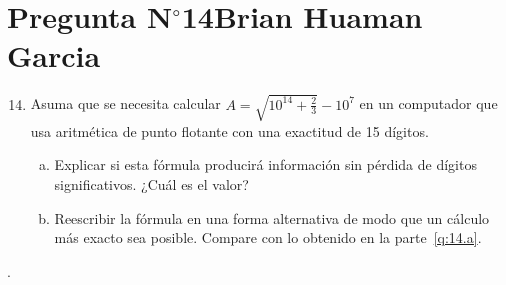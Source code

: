 \section{Pregunta N$^{\circ}$14\qquad Brian Huaman Garcia}

\begin{frame}
	\begin{enumerate}\setcounter{enumi}{13}
		\item

		      Asuma que se necesita calcular
		      \begin{math}
			      A=
			      \sqrt{10^{14}+\frac{2}{3}}-10^{7}
		      \end{math}
		      en un computador que usa aritmética de punto flotante con
		      una exactitud de 15 dígitos.

		      \begin{enumerate}[a)]
			      \item\label{q:14.a}

			      Explicar si esta fórmula producirá información sin
			      pérdida de dígitos significativos.
			      ¿Cuál es el valor?

			      \item\label{q:14.b}

			      Reescribir la fórmula en una forma alternativa de
			      modo que un cálculo más exacto sea posible.
			      Compare con lo obtenido en la parte~\eqref{q:14.a}.
		      \end{enumerate}
	\end{enumerate}

	\begin{solution}
		.
	\end{solution}
\end{frame}
